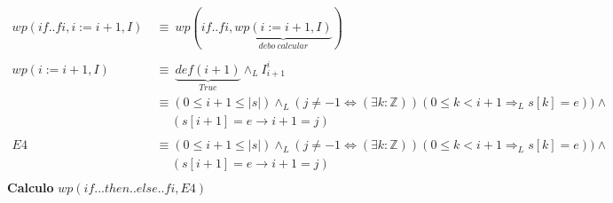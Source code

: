 \documentclass[12pt]{book}
\begin{document}
\begin{align*}
wp( if..fi,   i := i +1, I )  \ &\equiv \ wp( if..fi,  \underbrace{ wp( i := i +1, I)}_{debo \ calcular} ) \\ \\
wp( i := i +1, I) \ &\equiv \  \underbrace{def(i+1)}_{True} \land_L I_{i+1}^i \\
&\equiv  (0\leq i +1 \leq|s|) \land_L ( j\neq -1 \Leftrightarrow (\exists k: \mathbb{Z})) ( 0 \leq k < i + 1 \Rightarrow_L s[k] = e)) \wedge \\
& \quad \ (s[i+1] = e \rightarrow i+1 = j)  \\ \\
E4 &\equiv  (0\leq i +1 \leq|s|) \land_L ( j\neq -1 \Leftrightarrow (\exists k: \mathbb{Z})) ( 0 \leq k < i + 1 \Rightarrow_L s[k] = e))\wedge \\
& \quad \  (s[i+1] = e \rightarrow i+1 = j)  \\
\end{align*}
\textbf{Calculo} $wp( if...then..else..fi,  E4 )$ \\
\end{document}
